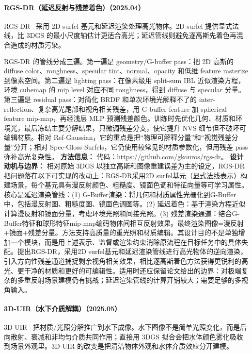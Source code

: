 \paragraph{RGS-DR（延迟反射与残差着色）（2025.04）}
RGS-DR~\cite{2504_18468} 采用 2D surfel 基元和延迟渲染处理高光物体。2D surfel 提供显式法线，比 3DGS 的最小尺度轴估计更适合高光；延迟管线则避免逐高斯先着色再混合造成的材质污染。

RGS-DR 的管线分成三遍。第一遍是 geometry/G-buffer pass：把 2D 高斯的 diffuse color、roughness、specular tint、normal、opacity 和低维 feature rasterize 到像素空间。第二遍是 lighting pass：在像素级用 split-sum IBL 近似渲染方程，环境 cubemap 的 mip level 对应不同 roughness，得到 diffuse 与 specular 分量。第三遍是 residual pass：对简化 BRDF 和单次环境光解释不了的 inter-reflection、复杂高光尾部和视角相关残差，用 G-buffer feature 加 spherical feature mip-map，再经浅层 MLP 预测残差颜色。训练时先优化几何、材质和环境光，最后冻结主要分解结果，只微调残差分支，使它提升 NVS 细节但不破坏可编辑材质。相对 Ref-Gaussian，它的重点是把“物理可解释分量”和“视觉残差分量”分开；相对 Spec-Gloss Surfels，它仍使用较常见的材质参数化，但用残差 pass 弥补高光复杂性。
\textbf{方法信息：} 代码：\url{https://github.com/gkouros/rgs-dr}。
\textbf{设计动机与边界：} 相对原始 3DGS 以独立高斯和图像重建误差为主的设定，RGS-DR 把问题落在以下可实现的改动上：RGS-DR采用2D surfel基元（显式法线表示）构建场景，每个基元具有漫反射颜色、粗糙度、镜面色调和特征向量等可学习属性。核心是延迟渲染管线：(1) G-Buffer渲染：将几何和材质属性光栅化到G-Buffer中，包括漫反射图、粗糙度图、镜面色调图等。(2) 延迟着色：基于渲染方程近似计算漫反射和镜面分量，考虑环境光照和间接光照。(3) 残差渲染通道：结合G-Buffer特征和球形特征mip-map编码物体间相互反射效果。最终渲染图像=漫反射+镜面+残差分量。方法支持高质量的重光照和材质编辑。其设计目的不是单独增加一个模块，而是用上述表示、监督或渲染约束消除原流程在目标任务中的具体失配。提出RGS-DR，采用2D surfel基元和延迟渲染管线进行高光物体的逆向渲染，引入方向性残差通道捕捉剩余视角相关效果，相比逐高斯着色方法获得更锐利的高光、更干净的材质和更好的可编辑性。适用时还应保留论文给出的边界：对极端复杂的多重反射场景建模仍有挑战；延迟渲染管线的计算开销较大；需要足够的多视角输入。
\paragraph{3D-UIR（水下介质解耦）（2025.05）}
3D-UIR~\cite{2505_21238} 把材质/光照分解推广到水下成像。水下图像不是简单光照变化，而是后向散射、衰减和非均匀介质共同作用；直接用 3DGS 拟合会把水体颜色雾化吸收到场景外观里。3D-UIR 的改变是把清洁物体外观和水体介质效应分开建模。

